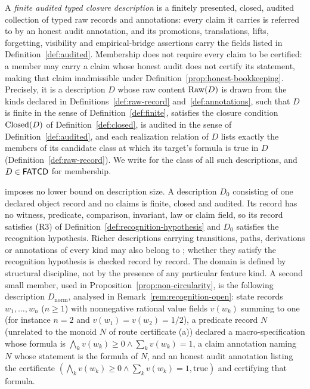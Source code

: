 \begin{definition}\label{def:fatcd}
A \emph{finite audited typed closure description} is a finitely presented,
closed, audited collection of typed raw records and annotations: every claim
it carries is referred to by an honest audit annotation, and its promotions,
translations, lifts, forgetting, visibility and empirical-bridge assertions
carry the fields listed in Definition~\ref{def:audited}. Membership does not
require every claim to be certified: a member may carry a claim whose honest
audit does not certify its statement, making that claim inadmissible under
Definition~\ref{prop:honest-bookkeeping}. Precisely, it is a
description \(D\) whose raw content \(\operatorname{Raw}\!\left(D\right)\) is drawn from the kinds
declared in Definitions~\ref{def:raw-record} and~\ref{def:annotations}, such
that \(D\) is finite in the sense of Definition~\ref{def:finite}, satisfies
the closure condition \(\operatorname{Closed}\!\left(D\right)\) of Definition~\ref{def:closed}, is
audited in the sense of Definition~\ref{def:audited}, and each realization relation of \(D\) lists exactly the members of its candidate class at which its target's formula is true in \(D\) (Definition~\ref{def:raw-record}). We write \FATCD{} for
the class of all such descriptions, and \(D \in \mathsf{FATCD}{}\) for membership.
\end{definition}

\begin{remark}\label{rem:fatcd-minimality}
\FATCD{} imposes no lower bound on description size. A description \(D_0\)
consisting of one declared object record and no claims is finite, closed and
audited. Its record has no witness, predicate, comparison, invariant, law or
claim field, so its record satisfies (R3) of
Definition~\ref{def:recognition-hypothesis} and \(D_0\) satisfies the
recognition hypothesis. Richer descriptions carrying
transitions, paths, derivations or annotations of every kind may also belong
to \FATCD{}; whether they satisfy the recognition hypothesis is checked record
by record. The domain is defined by structural discipline, not by the presence
of any particular feature kind. A second small member, used in
Proposition~\ref{prop:non-circularity}, is the following description \(D_{\mathrm{norm}}\), analysed in
Remark~\ref{rem:recognition-open}: state records \(w_1,\dots,w_n\) (\(n\ge1\))
with nonnegative rational value fields \(v(w_k)\) summing to one (for instance
\(n=2\) and \(v(w_1)=v(w_2)=1/2\)), a predicate record \(N\) (unrelated to the monoid \(N\) of route certificate (a)) declared a
macro-specification whose formula is \(\bigwedge_k v(w_k)\ge0\wedge\sum_k v(w_k)=1\), a claim annotation
naming \(N\) whose statement is the formula of \(N\), and an honest audit
annotation listing the certificate \((\bigwedge_k v(w_k)\ge0\wedge\sum_k v(w_k)=1,\mathrm{true})\) and
certifying that formula.
\end{remark}

